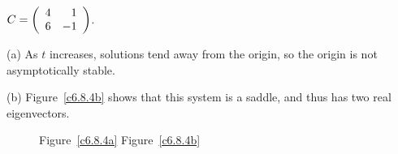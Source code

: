 \documentclass{ximera}
\begin{document}
\begin{exercise} \label{c6.8.4b}
$C=\left(\begin{array}{rr} 4 & 1\\ 6 &-1\end{array}\right)$.

\begin{solution}

(a) As $t$ increases, solutions tend away from the origin, so the origin
is not asymptotically stable.

(b) Figure~\ref{c6.8.4b} shows that this system is a saddle, and thus
has two real eigenvectors.

\begin{figure}[htb]
                       \centerline{%
                       }
                \centerline{Figure~\ref{c6.8.4a}\hspace{2.1in}
Figure~\ref{c6.8.4b}}
\end{figure}




\end{solution}
\end{exercise}
\end{document}
